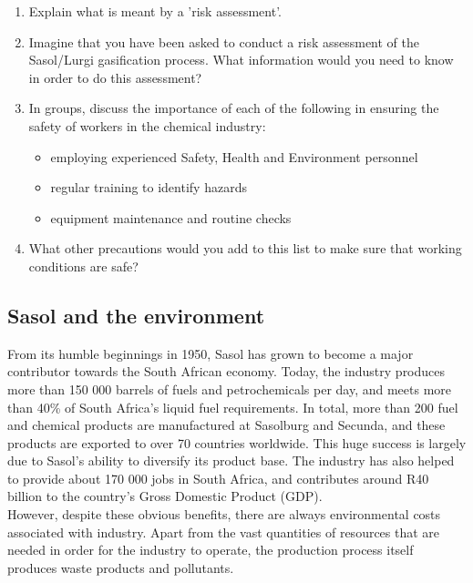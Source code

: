 {\begin{enumerate}
\item{Explain what is meant by a 'risk assessment'.}
\item{Imagine that you have been asked to conduct a risk assessment of the Sasol/Lurgi gasification process. What information would you need to know in order to do this assessment?}
\item{In groups, discuss the importance of each of the following in ensuring the safety of workers in the chemical industry:}

\begin{itemize}
\item{employing experienced Safety, Health and Environment personnel}
\item{regular training to identify hazards}
\item{equipment maintenance and routine checks}
\end{itemize}

\item{What other precautions would you add to this list to make sure that working conditions are safe?}

\end{enumerate}

}

\subsection{Sasol and the environment}

From its humble beginnings in 1950, Sasol has grown to become a major contributor towards the South African economy. Today, the industry produces more than 150 000 barrels of fuels and petrochemicals per day, and meets more than 40\% of South Africa's liquid fuel requirements. In total, more than 200 fuel and chemical products are manufactured at Sasolburg and Secunda, and these products are exported to over 70 countries worldwide. This huge success is largely due to Sasol's ability to diversify its product base. The industry has also helped to provide about 170 000 jobs in South Africa, and contributes around R40 billion to the country's Gross Domestic Product (GDP).\\

However, despite these obvious benefits, there are always environmental costs associated with industry. Apart from the vast quantities of resources that are needed in order for the industry to operate, the production process itself produces waste products and pollutants.

